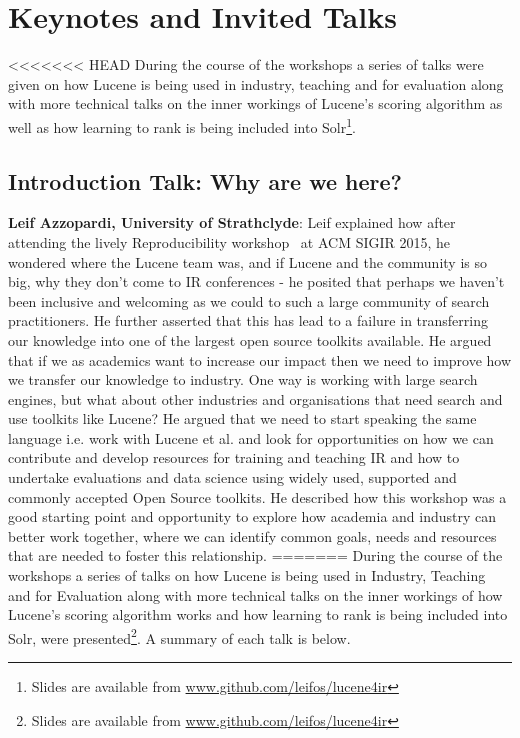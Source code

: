\section{Keynotes and Invited Talks}
<<<<<<< HEAD
During the course of the workshops a series of talks were given on how Lucene is being used in industry, teaching and for evaluation along with more technical talks on the inner workings of Lucene's scoring algorithm as well as how learning to rank is being included into Solr\footnote{\scriptsize{Slides are available from \url{www.github.com/leifos/lucene4ir}}}. 

\subsection*{Introduction Talk: Why are we here?}
{\bf Leif Azzopardi, University of Strathclyde}:
Leif explained how after attending the lively Reproducibility workshop~\cite{arguello2016repro} at ACM SIGIR 2015, he wondered where the Lucene team was, and if Lucene and the community is so big, why they don't come to IR conferences - he posited that perhaps we haven't been inclusive and welcoming as we could to such a large community of search practitioners. He further asserted that this has lead to a failure in transferring our knowledge into one of the largest open source toolkits available. He argued that if we as academics want to increase our impact then we need to improve how we transfer our knowledge to industry. One way is working with large search engines, but what about other industries and organisations that need search and use toolkits like Lucene? He argued that we need to start speaking the same language i.e. work with Lucene et al. and look for opportunities on how we can contribute and develop resources for training and teaching IR and how to undertake evaluations and data science using widely used, supported and commonly accepted Open Source toolkits. He described how this workshop was a good starting point and opportunity to explore how academia and industry can better work together, where we can identify common goals, needs and resources that are needed to foster this relationship. 
=======
During the course of the workshops a series of talks on how Lucene is being used in Industry, Teaching and for Evaluation along with more technical talks on the inner workings of how Lucene's scoring algorithm works and how learning to rank is being included into Solr, were presented\footnote{\scriptsize{Slides are available from \url{www.github.com/leifos/lucene4ir}}}. A summary of each talk is below.

